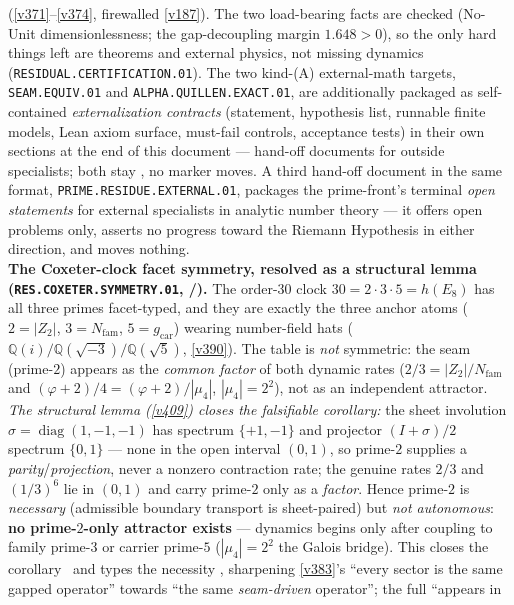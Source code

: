 \documentclass[11pt,a4paper]{article}
\newcommand{\Nfam}{N_{\mathrm{fam}}}
\newcommand{\gcar}{g_{\mathrm{car}}}
\begin{document}
\begin{keybox}
(\vref{v371}--\vref{v374}, firewalled \vref{v187}). The two load-bearing facts are checked (No-Unit
dimensionlessness; the gap-decoupling margin $1.648>0$), so the only hard things left are theorems and external
physics, not missing dynamics (\texttt{RESIDUAL.CERTIFICATION.01}). The two kind-(A) external-math
targets, \texttt{SEAM.EQUIV.01} and \texttt{ALPHA.QUILLEN.EXACT.01}, are additionally packaged as
self-contained \emph{externalization contracts} (statement, hypothesis list, runnable finite models,
Lean axiom surface, must-fail controls, acceptance tests) in their own sections at the end of this
document --- hand-off documents for outside specialists; both stay \mO, no marker moves.  A third
hand-off document in the same format, \texttt{PRIME.RESIDUE.EXTERNAL.01}, packages the
prime-front's terminal \emph{open statements} for external specialists in analytic number theory
--- it offers open problems only, asserts no progress toward the Riemann Hypothesis in either
direction, and moves nothing.
\smallskip\\
\noindent\textbf{The Coxeter-clock facet symmetry, resolved as a structural lemma
(\texttt{RES.COXETER.SYMMETRY.01}, /).} The
order-$30$ clock $30=2{\cdot}3{\cdot}5=h(E_8)$ has all three primes facet-typed, and they are exactly the three
anchor atoms ($2{=}|Z_2|$, $3{=}\Nfam$, $5{=}\gcar$) wearing number-field hats
($\mathbb Q(i)/\mathbb Q(\sqrt{-3})/\mathbb Q(\sqrt5)$, \vref{v390}). The table is \emph{not} symmetric: the seam
(prime-$2$) appears as the \emph{common factor} of both dynamic rates ($2/3=|Z_2|/\Nfam$ and
$(\varphi{+}2)/4=(\varphi{+}2)/|\mu_4|$, $|\mu_4|{=}2^2$), not as an independent attractor. \emph{The structural
lemma (\vref{v409}) closes the falsifiable corollary:} the sheet involution $\sigma{=}\operatorname{diag}(1,-1,-1)$
has spectrum $\{+1,-1\}$ and projector $(I{+}\sigma)/2$ spectrum $\{0,1\}$ --- none in the open interval $(0,1)$,
so prime-$2$ supplies a \emph{parity}/\emph{projection}, never a nonzero contraction rate; the genuine rates $2/3$
and $(1/3)^6$ lie in $(0,1)$ and carry prime-$2$ only as a \emph{factor}. Hence prime-$2$ is \emph{necessary}
(admissible boundary transport is sheet-paired) but \emph{not autonomous}: \textbf{no prime-$2$-only attractor
exists} --- dynamics begins only after coupling to family prime-$3$ or carrier prime-$5$ ($|\mu_4|{=}2^2$ the
Galois bridge). This closes the corollary \mE\ and types the necessity \mC, sharpening \vref{v383}'s ``every
sector is the same gapped operator'' towards ``the same \emph{seam-driven} operator''; the full ``appears in

\end{keybox}
\end{document}
